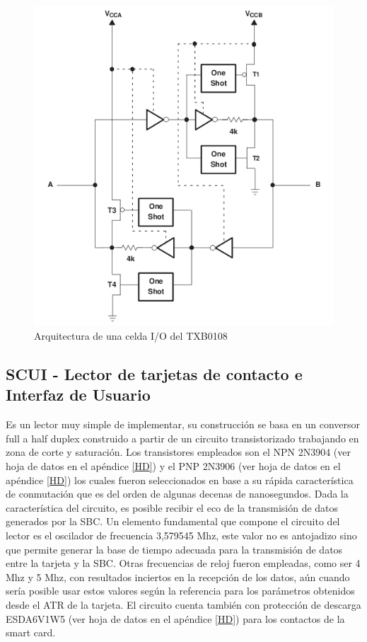 \bigskip
\bigskip
\begin{figure}[H]
\centering
  \begin{center}
  \includegraphics[scale=.3]{Imagenes/TXB0108.png} 
  \end{center}
  \caption{Arquitectura de una celda I/O del TXB0108}\label{Fig:Celda_TXB0108} 
\end{figure}


\subsection{SCUI - Lector de tarjetas de contacto e Interfaz de Usuario}


Es un lector muy simple de implementar, su construcción se basa en un conversor full a half duplex construido a partir de un circuito transistorizado trabajando en zona de corte y saturación. Los transistores empleados son el NPN 2N3904 (ver hoja de datos en el apéndice \ref{HD}) y el PNP 2N3906 (ver hoja de datos en el apéndice \ref{HD}) los cuales fueron seleccionados en base a su rápida característica de conmutación que es del orden de algunas decenas de nanosegundos. Dada la característica del circuito, es posible recibir el eco de la transmisión de datos generados por la SBC. 
Un elemento fundamental que compone el circuito del lector es el oscilador de frecuencia 3,579545 Mhz, este valor no es antojadizo sino que permite generar la base de tiempo adecuada para la transmisión de datos entre la tarjeta y la SBC. Otras frecuencias de reloj fueron empleadas, como ser 4 Mhz y 5 Mhz, con resultados inciertos en la recepción de los datos, aún cuando sería posible usar estos valores según la referencia \cite{SCHb} para los parámetros obtenidos desde el ATR de la tarjeta. 
El circuito cuenta también con protección de descarga ESDA6V1W5 (ver hoja de datos en el apéndice \ref{HD}) para los contactos de la smart card.

